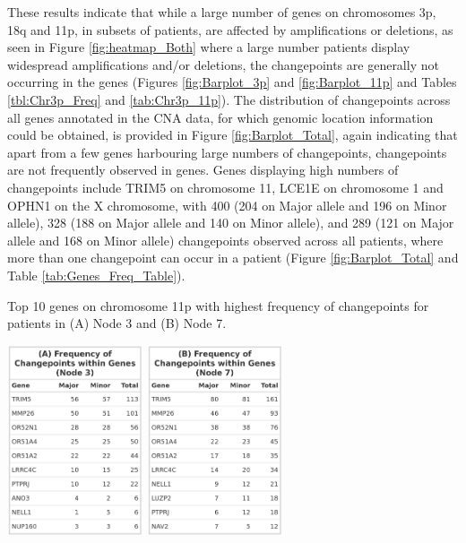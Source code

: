 These results indicate that while a large number of genes on chromosomes 3p, 18q and 11p, in subsets of patients, are affected by amplifications or deletions, as seen in Figure \ref{fig:heatmap_Both} where a large number patients display widespread amplifications and/or deletions, the changepoints are generally not occurring in the genes (Figures \ref{fig:Barplot_3p} and \ref{fig:Barplot_11p} and Tables \ref{tbl:Chr3p_Freq} and \ref{tab:Chr3p_11p}). The distribution of changepoints across all genes annotated in the CNA data, for which genomic location information could be obtained, is provided in Figure \ref{fig:Barplot_Total}, again indicating that apart from a few genes harbouring large numbers of changepoints, changepoints are not frequently observed in genes. Genes displaying high numbers of changepoints include TRIM5 on chromosome 11, LCE1E on chromosome 1 and OPHN1 on the X chromosome, with 400 (204 on Major allele and 196 on Minor allele), 328 (188 on Major allele and 140 on Minor allele), and 289 (121 on Major allele and 168 on Minor allele) changepoints observed across all patients, where more than one changepoint can occur in a patient (Figure \ref{fig:Barplot_Total} and Table \ref{tab:Genes_Freq_Table}).

\begin{table}[!htb]
\caption[Top 10 genes on chromosome 11p with highest frequency of changepoints for patients in Nodes 3 and 7.]{Top 10 genes on chromosome 11p with highest frequency of changepoints for patients in (A) Node 3 and (B) Node 7.}
\centering
\includegraphics[width = 0.3\textwidth]{../tables/Chapter_6/Chr11_Node_3.png}
\hspace{1cm}
\includegraphics[width = 0.3\textwidth]{../tables/Chapter_6/Chr11_Node_7.png}
\label{tab:Chr3p_11p}
\end{table}

